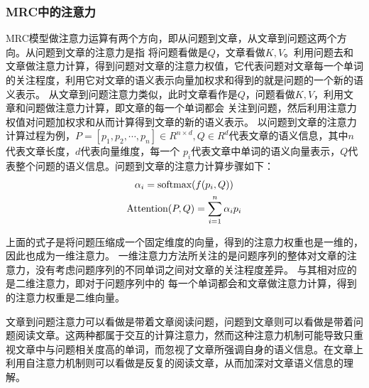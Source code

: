 \subsubsection{MRC中的注意力}
MRC模型做注意力运算有两个方向，即从问题到文章，从文章到问题这两个方向。从问题到文章的注意力是指
将问题看做是$Q$，文章看做$K,V$。利用问题去和文章做注意力计算，得到问题对文章的注意力权值，它代表问题对文章每一个单词的关注程度，利用它对文章的语义表示向量加权求和得到的就是问题的一个新的语义表示。
从文章到问题注意力类似，此时文章看作是$Q$，问题看做$K,V$，利用文章和问题做注意力计算，即文章的每一个单词都会
关注到问题，然后利用注意力权值对问题加权求和从而计算得到文章的新的语义表示。
以问题到文章的注意力计算过程为例，$P=[p_1,p_2,\cdots,p_n] \in R^{n\times d},Q\in R^{d}$代表文章的语义信息，其中$n$代表文章长度，$d$代表向量维度，每一个
$p_i$代表文章中单词的语义向量表示，$Q$代表整个问题的语义信息。问题到文章的注意力计算步骤如下：
\begin{gather}
	\alpha_i=\text{softmax}(f(p_i,Q)) \notag \\
	\text{Attention}(P,Q)=\sum_{i=1}^{n}\alpha_{i}p_i \notag 
\end{gather}

上面的式子是将问题压缩成一个固定维度的向量，得到的注意力权重也是一维的，因此也成为一维注意力。
一维注意力方法所关注的是问题序列的整体对文章的注意力，没有考虑问题序列的不同单词之间对文章的关注程度差异。
与其相对应的是二维注意力，即对于问题序列中的
每一个单词都会和文章做注意力计算，得到的注意力权重是二维向量。

文章到问题注意力可以看做是带着文章阅读问题，问题到文章则可以看做是带着问题阅读文章。这两种都属于交互的计算注意力，然而这种注意力机制可能导致只重视文章中与问题相关度高的单词，而忽视了文章所强调自身的语义信息。在文章上利用自注意力机制则可以看做是反复的阅读文章，从而加深对文章语义信息的理解。

